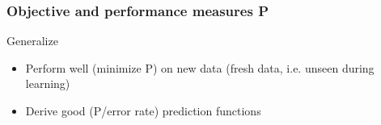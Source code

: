 \documentclass[pressentation,9pt,aspectratio=1610,xcolor=table]{beamer}
\newcommand{\doigt}{\noindent \Pisymbol{pzd}{43}}
\begin{document}
\begin{frame}
  \frametitle{Objective and performance measures P}

  \begin{block}{Generalize}
    \begin{itemize}
    \item Perform well (minimize P) on \alert{new data} (fresh data, i.e. unseen during learning)
    \item[\doigt]  Derive good (P/error rate) prediction functions
    \end{itemize}
  \end{block}


\end{frame}
\end{document}
